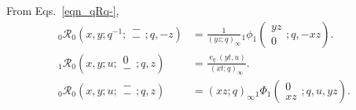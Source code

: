 \documentclass{cimart}
\newcommand{\rbhs}{\mathcal{R}}
\DeclareMathOperator{\ope}{e}
\begin{document}
From Eqs.~\eqref{eqn_qRq-},
\begin{align*}
    {}_{0}\rbhs_{0}\left(x,y;q^{-1};
        \begin{array}{c}
             -\\
             -
        \end{array};
        q,-z
        \right)&=\frac{1}{(yz;q)_{\infty}}{}_{1}\phi_{1}\left(
        \begin{array}{c}
             yz \\
             0
        \end{array};
        q,-xz
        \right).\\
        {}_{1}\rbhs_{0}\left(x,y;u;
        \begin{array}{c}
             0\\
             -
        \end{array};
        q,z
        \right)&=\frac{\ope_{q}(yt,u)}{(xt;q)_{\infty}}.\\
        {}_{0}\rbhs_{0}\left(x,y;u;
        \begin{array}{c}
             -\\
             -
        \end{array};
        q,z
        \right)&=(xz;q)_{\infty}{}_{1}\Phi_{1}\left(
        \begin{array}{c}
             0 \\
             xz
        \end{array};
        q,u,yz
        \right).
\end{align*}
\end{document}
